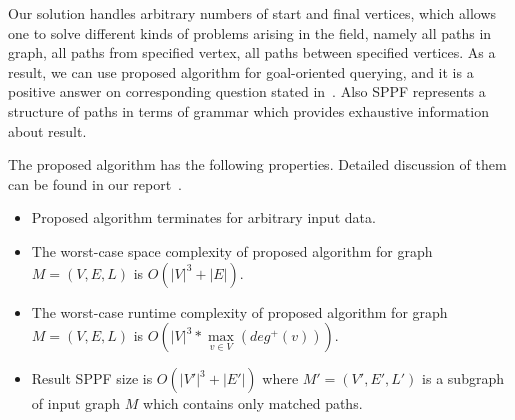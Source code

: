 %

Our solution handles arbitrary numbers of start and final vertices, which allows one to solve different kinds of problems arising in the field, namely all paths in graph, all paths from specified vertex, all paths between specified vertices. As a result, we can use proposed algorithm for goal-oriented querying, and it is a positive answer on corresponding question stated in~\cite{Hellings16}.
Also SPPF represents a structure of paths in terms of grammar which provides exhaustive information about result. 

The proposed algorithm has the following properties. Detailed discussion of them can be found in our report~\cite{GrigorevR16}.
\begin{itemize} 
\item Proposed algorithm terminates for arbitrary input data.
\item The worst-case space complexity of proposed algorithm for graph $M=(V,E,L)$ is $O(|V|^3 + |E|)$.
\item The worst-case runtime complexity of proposed algorithm for graph $M=(V,E,L)$ is $O\left(|V|^3*\max\limits_{v \in V}\left(deg^+\left(v\right)\right)\right).$
\item Result SPPF size is $O(|V'|^3 + |E'|)$ where $M'=(V',E',L')$ is a subgraph of input graph $M$ which contains only matched paths.
\end{itemize}
